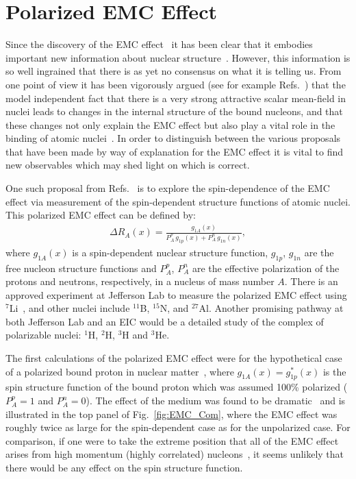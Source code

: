 \section{Polarized EMC Effect\label{sec:pemc}}
%
Since the discovery of the EMC effect~\cite{Aubert:1983xm,Bodek:1983ec} it has been clear that it embodies important new information about nuclear structure~\cite{Geesaman:1995yd}. However, this information is so well ingrained that there is as yet no consensus on what it is telling us. From one point of view it has been vigorously argued (see for example Refs.~\cite{Mineo:2003vc,Thomas:2016bxx,Guichon:2018uew}) that the model independent fact that there is a very strong attractive scalar mean-field in nuclei leads to changes in the internal structure of the bound nucleons, and that these changes not only explain the EMC effect but also play a vital role in the binding of atomic nuclei~\cite{Stone:2017oqt,Stone:2016qmi}. In order to distinguish between the various proposals that have been made by way of explanation for the EMC effect it is vital to find new observables which may shed light on which is correct.

One such proposal from Refs.~\cite{Cloet:2005rt,Cloet:2006bq} is to explore the spin-dependence of the EMC effect via measurement of the spin-dependent structure functions of atomic nuclei. This polarized EMC effect can be defined by:
%
\begin{align}
\Delta R_A(x) = \frac{g_{1A}(x)}{P_A^p\,g_{1p}(x) + P_A^n\,g_{1n}(x)},
\label{eq:pemc}
\end{align}
%
where $g_{1A}(x)$ is a spin-dependent nuclear structure function, $g_{1p}$, $g_{1n}$ are the free nucleon structure functions and $P_A^p$, $P_A^n$ are the effective polarization of the protons and neutrons, respectively, in a nucleus of mass number $A$. There is an approved experiment at Jefferson Lab to measure the polarized EMC effect using $^7$Li~\cite{jlabspin}, and other nuclei include $^{11}$B, $^{15}$N, and $^{27}$Al. Another promising pathway at both Jefferson Lab and an EIC would be a detailed study of the complex of polarizable nuclei: $^1$H, $^2$H, $^3$H and $^3$He.

The first calculations of the polarized EMC effect were for the hypothetical case of a polarized bound proton in nuclear matter~\cite{Cloet:2005rt}, where $g_{1A}(x) = g_{1p}^*(x)$ is the spin structure function of the bound proton which was assumed 100\% polarized ($P_A^p=1$ and $P_A^n = 0$). The effect of the medium was found to be dramatic~\cite{Cloet:2005rt} and is illustrated in the top panel of Fig.~\ref{fig:EMC_Com}, where the EMC effect was roughly twice as large for the spin-dependent case as for the unpolarized case.  For comparison, if one were to take the extreme position that all of the EMC effect arises from high momentum (highly correlated) nucleons~\cite{Weinstein:2010rt}, it seems unlikely that there would be any effect on the spin structure function.

